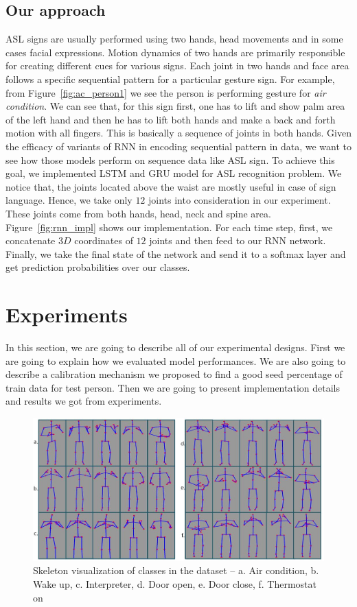 \documentclass[10pt,twocolumn,letterpaper]{article}
\begin{document}
\subsection{Our approach}
ASL signs are usually performed using two hands, head movements and in some cases facial expressions. Motion dynamics of two hands are primarily responsible for creating different cues for various signs. Each joint in two hands and face area follows a specific sequential pattern for a particular gesture sign. For example, from Figure~\ref{fig:ac_person1} we see the person is performing gesture for \textit{air condition}. We can see that, for this sign first, one has to lift and show palm area of the left hand and then he has to lift both hands and make a back and forth motion with all fingers. This is basically a sequence of joints in both hands. Given the efficacy of variants of RNN in encoding sequential pattern in data, we want to see how those models perform on sequence data like ASL sign. To achieve this goal, we implemented LSTM and GRU model for ASL recognition problem. We notice that, the joints located above the waist are mostly useful in case of sign language. Hence, we take only $12$ joints into consideration in our experiment. These joints come from both hands, head, neck and spine area. Figure~\ref{fig:rnn_impl} shows our implementation. For each time step, first, we concatenate $3D$ coordinates of $12$ joints and then feed to our RNN network. Finally, we take the final state of the network and send it to a softmax layer and get prediction probabilities over our classes.
\section{Experiments}
In this section, we are going to describe all of our experimental designs. First we are going to explain how we evaluated model performances. We are also going to describe a calibration mechanism we proposed to find a good seed percentage of train data for test person. Then we are going to present implementation details and results we got from experiments. 
\begin{figure}[h]
	\begin{center}
		\includegraphics[width=.8\linewidth]{sk_data_viz}
	\end{center}
	\caption{Skeleton visualization of classes in the dataset -- a. Air condition, b. Wake up, c. Interpreter, d. Door open, e. Door close, f. Thermostat on}
	\label{fig:sk_dat_viz}
\end{figure}
\end{document}
